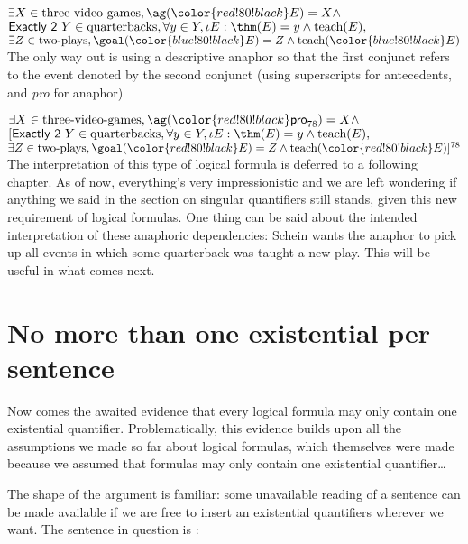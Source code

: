 \ex
$\exists X\in \text{three-video-games}, \ag({\color{red!80!black}E}) = X \wedge $\\
$\textsf{Exactly 2 } Y\in \text{quarterbacks}, \forall y \in Y, \iota E: \thm(E) = y \wedge \text{teach}(E),$\\
$\exists Z\in \text{two-plays}, \goal({\color{blue!80!black} E}) = Z \wedge \text{teach}({\color{blue!80!black} E})$\\
\xe
%
The only way out is using a descriptive anaphor so that the first conjunct refers to the event denoted by the second conjunct (using superscripts for antecedents, and \emph{pro} for anaphor)

\ex
$\exists X\in \text{three-video-games}, \ag({\color{red!80!black}\textsf{pro}_{78}}) = X \wedge $\\
$[\textsf{Exactly 2 } Y\in \text{quarterbacks}, \forall y \in Y, \iota E: \thm(E) = y \wedge \text{teach}(E),$\\
$\exists Z\in \text{two-plays}, \goal({\color{red!80!black} E}) = Z \wedge \text{teach}({\color{red!80!black} E})]^{78}$\\
\xe
%
The interpretation of this type of logical formula is deferred to a following chapter. As of now, everything's very impressionistic and we are left wondering if anything we said in the section on singular quantifiers still stands, given this new requirement of logical formulas. One thing can be said about the intended interpretation of these anaphoric dependencies: Schein wants the anaphor to pick up all events in which some quarterback was taught a new play. This will be useful in what comes next.

\section{No more than one existential per sentence}

Now comes the awaited evidence that every logical formula may only contain one existential quantifier. Problematically, this evidence builds upon all the assumptions we made so far about logical formulas, which themselves were made because we assumed that formulas may only contain one existential quantifier\ldots

The shape of the argument is familiar: some unavailable reading of a sentence can be made available if we are free to insert an existential quantifiers wherever we want. The sentence in question is \cnextxa:

